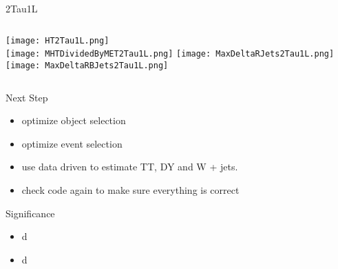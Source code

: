 \documentclass{beamer}
\begin{document}
\begin{frame}{2Tau1L}
    \begin{columns}[t]
    \centering
    \texttt{[image: HT2Tau1L.png]}\\
    \texttt{[image: MHTDividedByMET2Tau1L.png]}
    \centering
    \texttt{[image: MaxDeltaRJets2Tau1L.png]}\\
    \texttt{[image: MaxDeltaRBJets2Tau1L.png]}
    \end{columns}
\end{frame}














\begin{frame}{Next Step}
    \begin{itemize}
    \item
       optimize object selection
    \item
        optimize event selection
    \item
        use data driven to estimate TT, DY and W + jets.
    \item
       check code again to make sure everything is correct
    \end{itemize}
\end{frame}

\begin{frame}{Significance}
    \begin{itemize}
    \item
       d
    \item
        d
    \end{itemize}
    \begin{table}[htbp] %
    \centering
    \footnotesize%
    \setlength\tabcolsep{2pt}%
    \resizebox{\textwidth}{!}{%
        \begin{tabular}{|c | c |c|} 
         \hline
         process & preselection &  step1 \\%
         \hline
         \hline
         2Tau 3L & 3 tight lepton & 2 medium tau\\
         \hline
        \end{tabular}
    }
    \caption{Subchannel}
    \label{table:4}
    \end{table}   
\end{frame}
\end{document}
